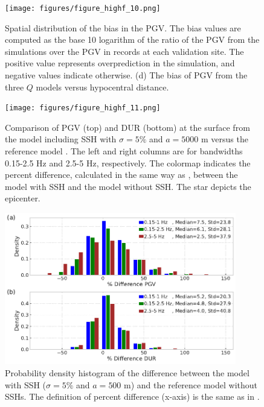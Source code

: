 \begin{figure}[!ht]
  \centering
  \texttt{[image: figures/figure\_highf\_10.png]}
  \caption{Spatial distribution of the bias in the PGV. The bias values are computed as the base 10 logarithm of the ratio of the PGV from the simulations over the PGV in records at each validation site. The positive value represents overprediction in the simulation, and negative values indicate otherwise. (d) The bias of PGV from the three $Q$ models versus hypocentral distance.
  }
  \label{fig:highf-10}
\end{figure}
\clearpage


\begin{figure}[!ht]
  \centering
  \texttt{[image: figures/figure\_highf\_11.png]}
  \caption{Comparison of PGV (top) and DUR (bottom) at the surface from the model including SSH with $\sigma = 5\%$ and $a = 5000$ m versus the reference model . The left and right columns are for bandwidths 0.15-2.5 Hz and 2.5-5 Hz, respectively. The colormap indicates the percent difference, calculated in the same way as , between the model with SSH and the model without SSH. The star depicts the epicenter.
  }
  \label{fig:highf-11}
\end{figure}
\clearpage

\begin{figure}[!ht]
  \centering
  \includegraphics[width=0.9\textwidth,height=0.9\textheight,keepaspectratio]{figures/figure_highf_12.pdf}
  \caption{Probability density histogram of the difference between the model with SSH ($\sigma = 5\%$ and $a = 500$ m) and the reference model without SSHs. The definition of percent difference (x-axis) is the same as in .
  }
  \label{fig:highf-12}
\end{figure}
\clearpage

